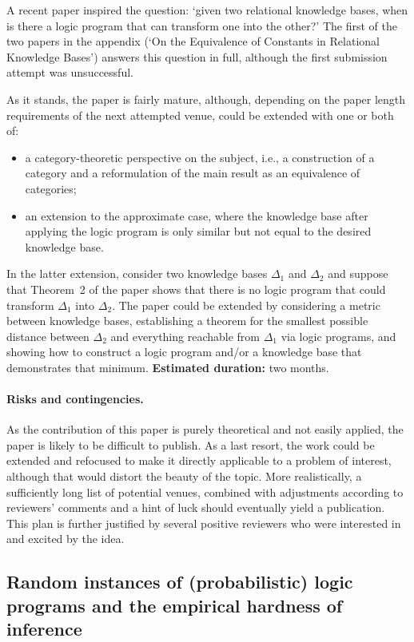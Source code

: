 \documentclass{article}
\begin{document}
A recent paper \cite{DBLP:conf/ijcai/DumancicGMB19} inspired the question:
`given two relational knowledge bases, when is there a logic program that can
transform one into the other?' The first of the two papers in the appendix (`On
the Equivalence of Constants in Relational Knowledge Bases') answers this
question in full, although the first submission attempt was unsuccessful.

As it stands, the paper is fairly mature, although, depending on the paper
length requirements of the next attempted venue, could be extended with one or
both of:
\begin{itemize}
\item a category-theoretic perspective on the subject, i.e., a construction of a
  category and a reformulation of the main result as an equivalence of
  categories;
\item an extension to the approximate case, where the knowledge base after
  applying the logic program is only similar but not equal to the desired
  knowledge base.
\end{itemize}
In the latter extension, consider two knowledge bases $\Delta_1$ and $\Delta_2$
and suppose that Theorem~2 of the paper shows that there is no logic
program that could transform $\Delta_1$ into $\Delta_2$. The paper could be
extended by considering a metric between knowledge bases, establishing a theorem
for the smallest possible distance between $\Delta_2$ and everything reachable
from $\Delta_1$ via logic programs, and showing how to construct a logic program
and/or a knowledge base that demonstrates that minimum. {\bf Estimated
  duration:} two months.

\paragraph{Risks and contingencies.} As the contribution of this paper is purely
theoretical and not easily applied, the paper is likely to be difficult to
publish. As a last resort, the work could be extended and refocused to make it
directly applicable to a problem of interest, although that would distort the
beauty of the topic. More realistically, a sufficiently long list of potential
venues, combined with adjustments according to reviewers' comments and a hint
of luck should eventually yield a publication. This plan is further justified by
several positive reviewers who were interested in and excited by the idea.

\subsection{Random instances of (probabilistic) logic programs and the empirical
  hardness of inference}
\end{document}
